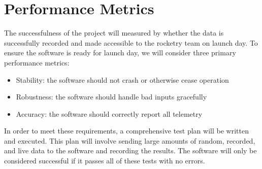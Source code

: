 \documentclass[10pt,journal,draftclsnofoot,onecolumn]{IEEEtran}
\begin{document}
	\section{Performance Metrics}
	
	The successfulness of the project will measured by whether the data
	is successfully recorded and made accessible to the rocketry team
	on launch day. To ensure the software is ready for launch day,
	we will consider three primary performance metrics:
	
	\begin{itemize}
		\item Stability: the software should not crash or otherwise cease operation
		\item Robustness: the software should handle bad inputs gracefully
		\item Accuracy: the software should correctly report all telemetry
	\end{itemize}
	
	In order to meet these requirements, a comprehensive test plan will
	be written and executed. This plan will involve sending large amounts
	of random, recorded, and live data to the software and recording the results.
	The software will only be considered successful if it passes all of these
	tests with no errors.
	
\end{document}

